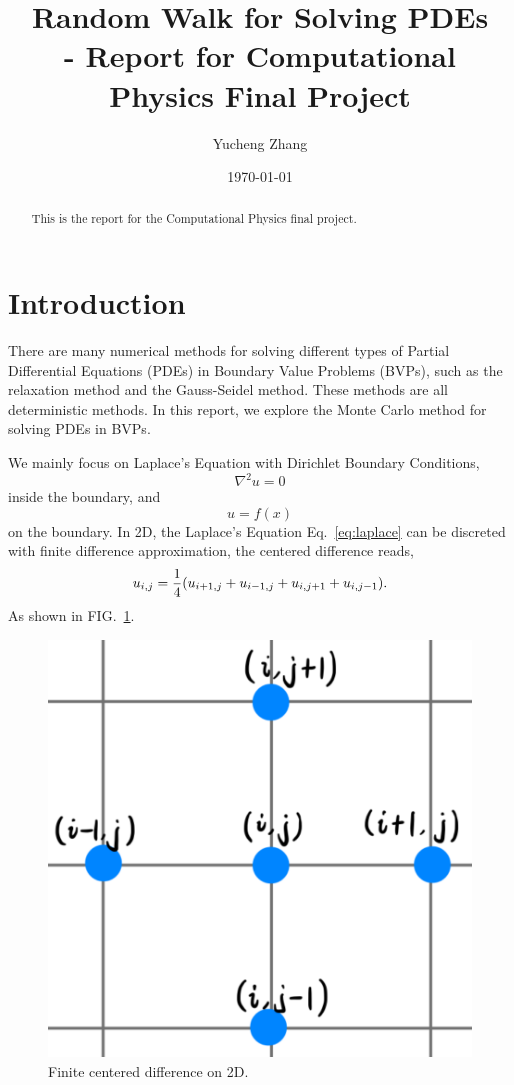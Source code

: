 \documentclass[aps, prl, reprint, groupedaddress]{revtex4-1}
\begin{document}
    
\title{Random Walk for Solving PDEs\\- Report for Computational Physics Final Project}
\author{Yucheng Zhang}
\date{\today}
    
\begin{abstract}
    This is the report for the Computational Physics final project.
\end{abstract}
    
\maketitle

\section{Introduction}

There are many numerical methods for solving different types of Partial Differential Equations (PDEs) in Boundary Value Problems (BVPs), such as the relaxation method and the Gauss-Seidel method. These methods are all deterministic methods. In this report, we explore the Monte Carlo method for solving PDEs in BVPs. 

We mainly focus on Laplace's Equation with Dirichlet Boundary Conditions,
\begin{equation}
    \nabla^2 u = 0
    \label{eq:laplace}
\end{equation} inside the boundary, and
\begin{equation}
    u = f(x)
\end{equation} on the boundary. In 2D, the Laplace's Equation Eq.~\ref{eq:laplace} can be discreted with finite difference approximation, the centered difference reads,
\begin{equation}
    u_{i,j} = \frac{1}{4} \qty(u_{i+1,j}+u_{i-1,j}+u_{i,j+1}+u_{i,j-1}).
\end{equation}
As shown in FIG.~\ref{fig:disc}.

\begin{figure}[htbp]
    \centering
    \includegraphics[width=.4\textwidth]{./figs/disc}
    \caption{\label{fig:disc} Finite centered difference on 2D.}
\end{figure}
\end{document}

